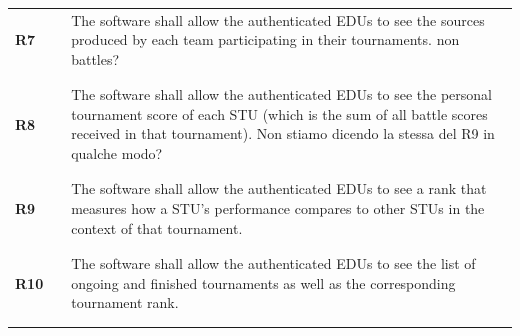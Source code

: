 \begin{longtable}[H]{l l p{12cm}}
    \textbf{R7}  & \vline & The software shall allow the authenticated EDUs to see the sources produced by each team participating in their tournaments. {\color{red} non battles?}                                                                                                                         \\
                 &        &                                                                                                                                                                                                                                                                                 \\\hline & & \\
    \textbf{R8}  & \vline & The software shall allow the authenticated EDUs to see the personal tournament score of each STU (which is the sum of all battle scores received in that tournament). {\color{red} Non stiamo dicendo la stessa del R9 in qualche modo?}                                        \\
                 &        &                                                                                                                                                                                                                                                                                 \\\hline & & \\
    \textbf{R9}  & \vline & The software shall allow the authenticated EDUs to see a rank that measures how a STU's performance compares to other STUs in the context of that tournament.                                                                                                                   \\
                 &        &                                                                                                                                                                                                                                                                                 \\\hline & & \\
    \textbf{R10} & \vline & The software shall allow the authenticated EDUs to see the list of ongoing and finished tournaments as well as the corresponding tournament rank.                                                                                                                               \\
                 &        &                                                                                                                                                                                                                                                                                 \\\hline & & \\

\end{longtable}
